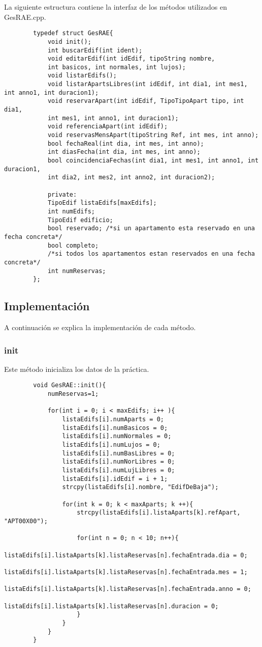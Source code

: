 \documentclass[12pt]{article}
\begin{document}
	La siguiente estructura contiene la interfaz de los métodos utilizados en GesRAE.cpp. 

	\begin{lstlisting}
		typedef struct GesRAE{
			void init();
			int buscarEdif(int ident);
			void editarEdif(int idEdif, tipoString nombre, 
			int basicos, int normales, int lujos);
			void listarEdifs();
			void listarApartsLibres(int idEdif, int dia1, int mes1, int anno1, int duracion1);
			void reservarApart(int idEdif, TipoTipoApart tipo, int dia1,
			int mes1, int anno1, int duracion1);
			void referenciaApart(int idEdif);
			void reservasMensApart(tipoString Ref, int mes, int anno);
			bool fechaReal(int dia, int mes, int anno);
			int diasFecha(int dia, int mes, int anno);
			bool coincidenciaFechas(int dia1, int mes1, int anno1, int duracion1,
			int dia2, int mes2, int anno2, int duracion2);
			
			private:
			TipoEdif listaEdifs[maxEdifs];
			int numEdifs;
			TipoEdif edificio;
			bool reservado; /*si un apartamento esta reservado en una fecha concreta*/
			bool completo; 
			/*si todos los apartamentos estan reservados en una fecha concreta*/
			int numReservas;
		};
	\end{lstlisting}
	
	\subsection{Implementación}
	
	A continuación se explica la implementación de cada método.
	
	\subsubsection{init}
	
	Este método inicializa los datos de la práctica.
	\begin{lstlisting}
		void GesRAE::init(){
			numReservas=1;
			
			for(int i = 0; i < maxEdifs; i++ ){
				listaEdifs[i].numAparts = 0;
				listaEdifs[i].numBasicos = 0;
				listaEdifs[i].numNormales = 0;
				listaEdifs[i].numLujos = 0;
				listaEdifs[i].numBasLibres = 0;
				listaEdifs[i].numNorLibres = 0;
				listaEdifs[i].numLujLibres = 0;
				listaEdifs[i].idEdif = i + 1;
				strcpy(listaEdifs[i].nombre, "EdifDeBaja");
				
				for(int k = 0; k < maxAparts; k ++){
					strcpy(listaEdifs[i].listaAparts[k].refApart, "APT00X00");
					
					for(int n = 0; n < 10; n++){
						listaEdifs[i].listaAparts[k].listaReservas[n].fechaEntrada.dia = 0;
						listaEdifs[i].listaAparts[k].listaReservas[n].fechaEntrada.mes = 1;
						listaEdifs[i].listaAparts[k].listaReservas[n].fechaEntrada.anno = 0;
						listaEdifs[i].listaAparts[k].listaReservas[n].duracion = 0;
					}
				}
			}
		}
	\end{lstlisting}
	
\end{document}
